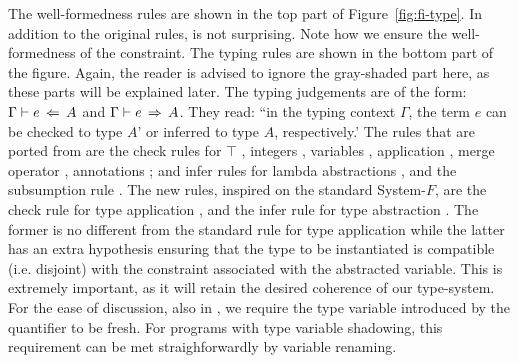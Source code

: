 The well-formedness rules are shown in the top part of
Figure~\ref{fig:fi-type}. 
In addition to the original rules,  is not surprising. 
Note how we ensure the well-formedness of the constraint. 
The typing rules are shown in the bottom part of the figure. 
Again, the reader is advised to ignore the
gray-shaded part here, as these parts will be explained later. 
The typing judgements are of the form: $\Gamma \vdash e \ \!\Leftarrow\! \ A$ and  
$\Gamma \vdash e \ \!\Rightarrow\! \ A$.
They read: ``in the typing context $\Gamma$, the term $e$ can be checked to
type $A$' or inferred to type $A$, respectively.' 
The rules that are ported from \oldname are the
check rules for $\top$ , integers , 
variables ,  application , merge operator  
, annotations ; and infer rules
for lambda abstractions , and the subsumption rule 
.
The new rules, inspired on the standard System-$F$, are the check rule for
type application , and the infer rule for type abstraction
.
The former is no different from the standard rule for type application while
the latter has an extra hypothesis ensuring that the type to be instantiated is
compatible (i.e. disjoint) with the constraint associated with the abstracted 
variable.
This is extremely important, as it will retain the desired coherence of our 
type-system.
For the ease of discussion, also in , we require the 
type variable introduced by the quantifier to be fresh. 
For programs with type variable shadowing, this requirement can be met 
straighforwardly by variable renaming.


